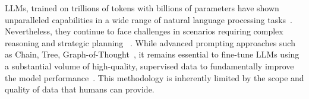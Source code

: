 



LLMs, trained on trillions of tokens with billions of parameters have shown unparalleled capabilities in a wide range of natural language processing tasks~\citep{touvron2023llama,team2023gemini,openai2023gpt}. Nevertheless, they continue to face challenges in scenarios requiring complex reasoning and strategic planning ~\citep{valmeekam2022large,stechly2024self}. While advanced prompting approaches such as Chain, Tree, Graph-of-Thought~\citep{wei2022chain,yao2024tree, besta2024graph, ding2023everything}, it remains essential to fine-tune LLMs using a substantial volume of high-quality, supervised data to fundamentally improve the model performance~\citep{nye2021show,lewkowycz2022solving,chung2022scaling}. This methodology is inherently limited by the scope and quality of data that humans can provide.

